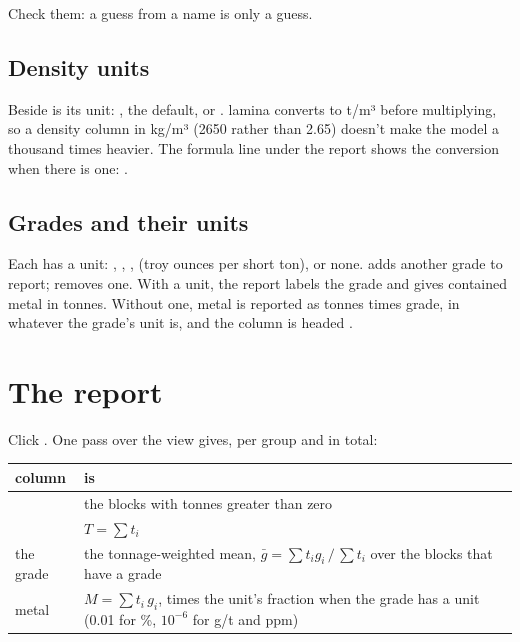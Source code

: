 Check them: a guess from a name is only a guess.

\subsection{Density units}\label{sec:gt-density-unit}

Beside  is its unit: , the default,  or . lamina converts
to t/m³ before multiplying, so a density column in kg/m³ (2650 rather than 2.65) doesn't make the model a
thousand times heavier. The formula line under the report shows the conversion when there is one:
\code{[kg/m³ → t/m³]}.

\subsection{Grades and their units}\label{sec:gt-grade-unit}

Each  has a unit: \ui{\%}, , ,  (troy ounces per short ton), or none.
 adds another grade to report;  removes one. With a unit, the report labels the
grade and gives contained metal in tonnes. Without one, metal is reported as tonnes times grade, in
whatever the grade's unit is, and the column is headed .

\section{The report}\label{sec:gt-report}

Click . One pass over the view gives, per group and in total:

\begin{center}\small
\begin{tabularx}{\linewidth}{@{}lL@{}}
\toprule
\sffamily\bfseries column & \sffamily\bfseries is \\
\midrule
{} & the blocks with tonnes greater than zero \\
 & $T = \sum t_i$ \\
the grade & the tonnage-weighted mean, $\bar{g} = \sum t_i g_i \,/\, \sum t_i$ over the blocks that have a
grade \\
metal & $M = \sum t_i\,g_i$, times the unit's fraction when the grade has a unit (0.01 for \%,
$10^{-6}$ for g/t and ppm) \\
\bottomrule
\end{tabularx}
\end{center}

